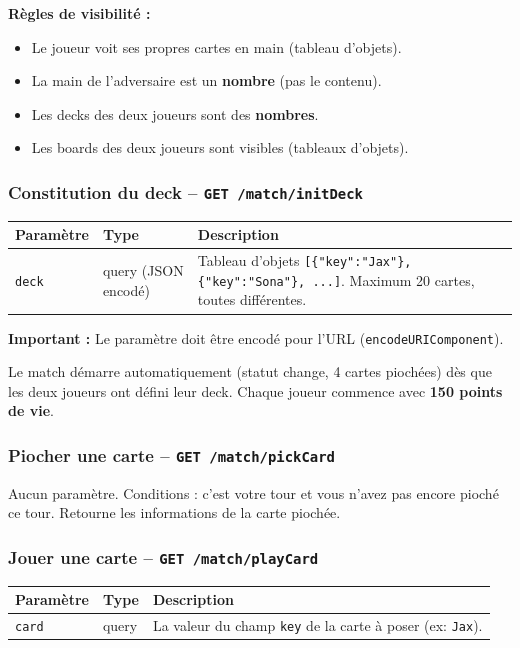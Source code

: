 \documentclass[12pt,a4paper]{article}
\begin{document}
\textbf{Règles de visibilité :}
\begin{itemize}[noitemsep]
    \item Le joueur voit ses propres cartes en main (tableau d'objets).
    \item La main de l'adversaire est un \textbf{nombre} (pas le contenu).
    \item Les decks des deux joueurs sont des \textbf{nombres}.
    \item Les boards des deux joueurs sont visibles (tableaux d'objets).
\end{itemize}

\subsubsection{Constitution du deck -- \texttt{GET /match/initDeck}}

\begin{tabularx}{\textwidth}{l l X}
\toprule
\textbf{Paramètre} & \textbf{Type} & \textbf{Description} \\
\midrule
\texttt{deck} & query (JSON encodé) & Tableau d'objets \texttt{[\{"key":"Jax"\}, \{"key":"Sona"\}, ...]}. Maximum 20 cartes, toutes différentes. \\
\bottomrule
\end{tabularx}

\vspace{0.2cm}
\textbf{Important :} Le paramètre doit être encodé pour l'URL (\texttt{encodeURIComponent}).

Le match démarre automatiquement (statut change, 4 cartes piochées) dès que les deux joueurs ont défini leur deck. Chaque joueur commence avec \textbf{150 points de vie}.

\subsubsection{Piocher une carte -- \texttt{GET /match/pickCard}}

Aucun paramètre. Conditions : c'est votre tour et vous n'avez pas encore pioché ce tour. Retourne les informations de la carte piochée.

\subsubsection{Jouer une carte -- \texttt{GET /match/playCard}}

\begin{tabularx}{\textwidth}{l l X}
\toprule
\textbf{Paramètre} & \textbf{Type} & \textbf{Description} \\
\midrule
\texttt{card} & query & La valeur du champ \texttt{key} de la carte à poser (ex: \texttt{Jax}). \\
\bottomrule
\end{tabularx}
\end{document}
